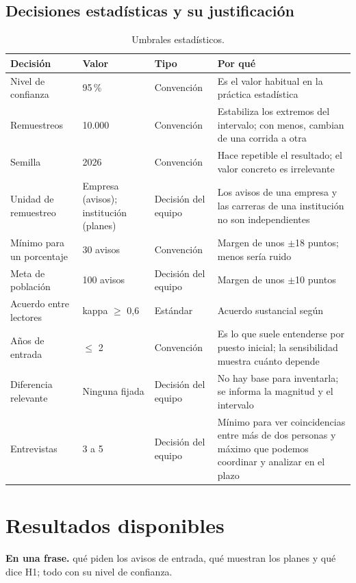 \documentclass[11pt,a4paper]{article}
\renewcommand{\le}{\ensuremath{\leq}}
\begin{document}
\subsection{Decisiones estadísticas y su justificación}
\begin{table}[H]
\centering\small
\begin{tabularx}{\textwidth}{L{3.3cm} L{2.6cm} L{2.2cm} X}
\toprule
{}\textbf{Decisión} & \textbf{Valor} & \textbf{Tipo} & \textbf{Por qué}\\
\midrule
Nivel de confianza & 95\,\% & Convención & Es el valor habitual en la práctica estadística\\
Remuestreos & 10.000 & Convención & Estabiliza los extremos del intervalo; con menos, cambian de una corrida a otra\\
Semilla & 2026 & Convención & Hace repetible el resultado; el valor concreto es irrelevante\\
Unidad de remuestreo & Empresa (avisos); institución (planes) & Decisión del equipo & Los avisos de una empresa y las carreras de una institución no son independientes\\
Mínimo para un porcentaje & 30 avisos & Convención & Margen de unos $\pm$18 puntos; menos sería ruido\\
Meta de población & 100 avisos & Decisión del equipo & Margen de unos $\pm$10 puntos\\
Acuerdo entre lectores & kappa $\geq$ 0,6 & Estándar & Acuerdo sustancial según \cite{landis1977}\\
Años de entrada & \le{} 2 & Convención & Es lo que suele entenderse por puesto inicial; la sensibilidad muestra cuánto depende\\
Diferencia relevante & Ninguna fijada & Decisión del equipo & No hay base para inventarla; se informa la magnitud y el intervalo\\
Entrevistas & 3 a 5 & Decisión del equipo & Mínimo para ver coincidencias entre más de dos personas y máximo que podemos coordinar y analizar en el plazo\\
\bottomrule
\end{tabularx}
\caption{Umbrales estadísticos.}
\end{table}

\section{Resultados disponibles}
\begin{enunasola}\textbf{En una frase.} qué piden los avisos de entrada, qué muestran los planes y qué dice H1; todo con su nivel de confianza.\end{enunasola}
\end{document}
